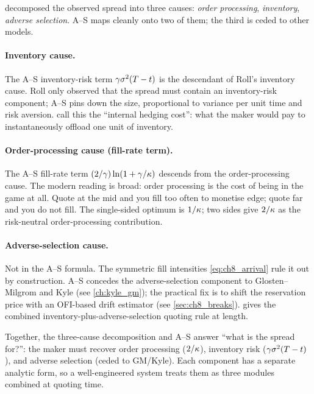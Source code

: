  decomposed the observed spread into three
causes: \emph{order processing}, \emph{inventory}, \emph{adverse
selection}. A--S maps cleanly onto two of them; the third is ceded
to other models.

\paragraph{Inventory cause.} The A--S inventory-risk term
$\gamma\sigma^2(T - t)$ is the descendant of Roll's inventory
cause. Roll only observed that the spread must contain an
inventory-risk component; A--S pins down the size, proportional to
variance per unit time and risk aversion. \citeCartea{} call this
the ``internal hedging cost'': what the maker would pay to
instantaneously offload one unit of inventory.

\paragraph{Order-processing cause (fill-rate term).} The A--S
fill-rate term $(2/\gamma)\ln(1 + \gamma/\kappa)$ descends from
the order-processing cause. The modern reading is broad: order
processing is the cost of being in the game at all. Quote at the
mid and you fill too often to monetise edge; quote far and you do
not fill. The single-sided optimum is $1/\kappa$; two sides give
$2/\kappa$ as the risk-neutral order-processing contribution.

\paragraph{Adverse-selection cause.} Not in the A--S formula. The
symmetric fill intensities \eqref{eq:ch8_arrival} rule it out by
construction. A--S concedes the adverse-selection component to
Glosten--Milgrom \citeGM{} and Kyle \citeKyle{} (see
\cref{ch:kyle_gm}); the practical fix is to shift the reservation
price with an OFI-based drift estimator (see
\cref{sec:ch8_breaks}). \citeBouchaud{} gives the combined
inventory-plus-adverse-selection quoting rule at length.

Together, the three-cause decomposition and A--S answer ``what is
the spread for?'': the maker must recover order processing
($2/\kappa$), inventory risk ($\gamma\sigma^2(T-t)$), and
adverse selection (ceded to GM/Kyle). Each component has a separate
analytic form, so a well-engineered system treats them as three
modules combined at quoting time.

